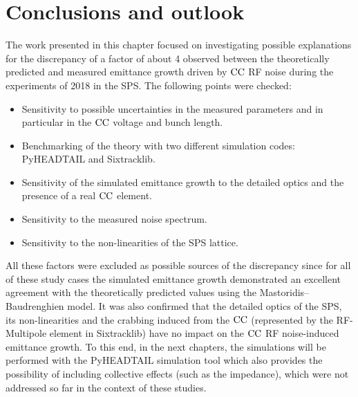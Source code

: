 \section{Conclusions and outlook}\label{sec:Ch6_conclusions}
The work presented in this chapter focused on investigating possible explanations for the discrepancy of a factor of about 4 observed between the theoretically predicted and measured emittance growth driven by ${\mathrm{CC}}$ RF noise during the experiments of 2018 in the SPS. The following points were checked:
\begin{itemize}
    \item Sensitivity to possible uncertainties in the measured parameters and in particular in the ${\mathrm{CC}}$ voltage and bunch length.
    \item Benchmarking of the theory with two different simulation codes: PyHEADTAIL and Sixtracklib.
    \item Sensitivity of the simulated emittance growth to the detailed optics and the presence of a real ${\mathrm{CC}}$ element.
    \item Sensitivity to the measured noise spectrum. 
    \item Sensitivity to the non-linearities of the SPS lattice.
\end{itemize}

All these factors were excluded as possible sources of the discrepancy since for all of these study cases the simulated emittance growth demonstrated an excellent agreement with the theoretically predicted values using the Mastoridis--Baudrenghien model. It was also confirmed that the detailed optics of the SPS, its non-linearities and the crabbing induced from the ${\mathrm{CC}}$ (represented by the RF-Multipole element in Sixtracklib) have no impact on the ${\mathrm{CC}}$ RF noise-induced emittance growth. To this end, in the next chapters, the simulations will be performed with the PyHEADTAIL simulation tool which also provides the possibility of including collective effects (such as the impedance), which were not addressed so far in the context of these studies.